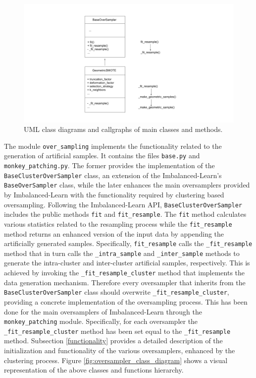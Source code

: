 \documentclass[preprint,12pt, a4paper]{elsarticle}
\begin{document}
\begin{figure}[H]
	\centering
	\includegraphics[width=1\linewidth]{../analysis/class_diagram}
	\caption{UML class diagrams and callgraphs of main classes and methods.}
	\label{fig:class_diagram}
\end{figure}

The module \texttt{over\_sampling} implements the functionality related to the generation of artificial samples. It contains the files \texttt{base.py} and \texttt{monkey\_patching.py}. The former provides the implementation of the \texttt{BaseClusterOverSampler} class, an extension of the Imbalanced-Learn's \texttt{BaseOverSampler} class, while the later enhances the main oversamplers provided by Imbalanced-Learn with the functionality required by clustering based oversampling. Following the Imbalanced-Learn API, \texttt{BaseClusterOverSampler} includes the public methods \texttt{fit} and \texttt{fit\_resample}. The \texttt{fit} method calculates various statistics related to the resampling process while the \texttt{fit\_resample} method returns an enhanced version of the input data by appending the artificially generated samples. Specifically, \texttt{fit\_resample} calls the \texttt{\_fit\_resample} method that in turn calls the \texttt{\_intra\_sample} and \texttt{\_inter\_sample} methods to generate the intra-cluster and inter-cluster artificial samples, respectively. This is achieved by invoking the \texttt{\_fit\_resample\_cluster} method that implements the data generation mechanism. Therefore every oversampler that inherits from the \texttt{BaseClusterOverSampler} class should overwrite \texttt{\_fit\_resample\_cluster}, providing a concrete implementation of the oversampling process. This has been done for the main oversamplers of Imbalanced-Learn through the \texttt{monkey\_patching} module. Specifically, for each oversampler the \texttt{\_fit\_resample\_cluster} method has been set equal to the \texttt{\_fit\_resample} method. Subsection \ref{functionality} provides a detailed description of the initialization and functionality of the various oversamplers, enhanced by the clustering process. Figure \ref{fig:oversampler_class_diagram} shows a visual representation of the above classes and functions hierarchy.
\end{document}
